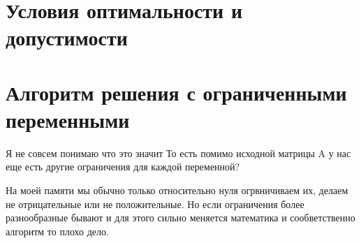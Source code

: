 \documentclass[a4paper,article,14pt]{extarticle}
\begin{document}
\section{Условия оптимальности и допустимости}

\section{Алгоритм решения с ограниченными переменными}

Я не совсем понимаю что это значит
То есть помимо исходной матрицы A у нас еще есть другие ограничения для каждой переменной?

На моей памяти мы обычно только относительно нуля огрвничиваем их, делаем не отрицательные или не положительные.
Но если ограничения более разнообразные бывают и для этого сильно меняется математика и сообветственно алгоритм то плохо дело.
\end{document}
